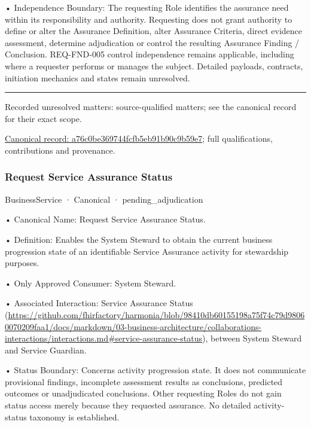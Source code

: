 •
Independence Boundary: The requesting Role identifies the assurance need within its responsibility and authority. Requesting does not grant authority to define or alter the Assurance Definition, alter Assurance Criteria, direct evidence assessment, determine adjudication or control the resulting Assurance Finding / Conclusion. REQ-FND-005 control independence remains applicable, including where a requester performs or manages the subject. Detailed payloads, contracts, initiation mechanics and states remain unresolved.



\medskip\hrule\medskip

{\small Recorded unresolved matters: source-qualified matters; see the canonical record for their exact scope.}\par
{\footnotesize \href{../../../../continuum/business/business-service/a76c0be369744fcfb5eb91b90c9b59e7.md}{Canonical record: a76c0be369744fcfb5eb91b90c9b59e7}; full qualifications, contributions and provenance.}\par
\subsubsection{Request Service Assurance Status}

\label{element:60f8cbc814614f669f31d4e78734c6d6}
{\small BusinessService · Canonical · pending\_adjudication}\par

•
Canonical Name: Request Service Assurance Status.



•
Definition: Enables the System Steward to obtain the current business progression state of an identifiable Service Assurance activity for stewardship purposes.



•
Only Approved Consumer: System Steward.



•
Associated Interaction: Service Assurance Status (\url{https://github.com/fhirfactory/harmonia/blob/98410db60155198a75f74c79d98060070209faa1/docs/markdown/03-business-architecture/collaborations-interactions/interactions.md#service-assurance-status}), between System Steward and Service Guardian.



•
Status Boundary: Concerns activity progression state. It does not communicate provisional findings, incomplete assessment results as conclusions, predicted outcomes or unadjudicated conclusions. Other requesting Roles do not gain status access merely because they requested assurance. No detailed activity-status taxonomy is established.



